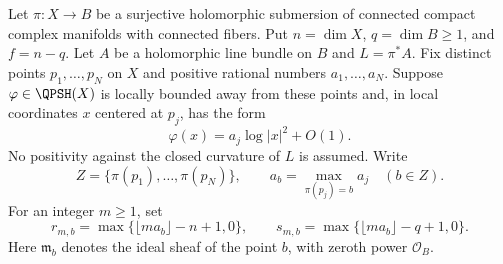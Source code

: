 Let $\pi:X\to B$ be a surjective holomorphic submersion of connected compact complex manifolds with connected fibers. Put $n=\dim X$, $q=\dim B\geq1$, and $f=n-q$. Let $A$ be a holomorphic line bundle on $B$ and $L=\pi^*A$. Fix distinct points $p_1,\ldots,p_N$ on $X$ and positive rational numbers $a_1,\ldots,a_N$. Suppose $\varphi\in\QPSH(X)$ is locally bounded away from these points and, in local coordinates $x$ centered at $p_j$, has the form
\begin{equation}\label{eq:isolated-selecting-poles}
 \varphi(x)=a_j\log|x|^2+O(1).
\end{equation}
No positivity against the closed curvature of $L$ is assumed. Write
\[
 Z=\{\pi(p_1),\ldots,\pi(p_N)\},\qquad
 a_b=\max_{\pi(p_j)=b}a_j\quad(b\in Z).
\]
For an integer $m\geq1$, set
\[
 r_{m,b}=\max\{\lfloor ma_b\rfloor-n+1,0\},\qquad
 s_{m,b}=\max\{\lfloor ma_b\rfloor-q+1,0\}.
\]
Here $\mathfrak m_b$ denotes the ideal sheaf of the point $b$, with zeroth power $\mathcal O_B$.

